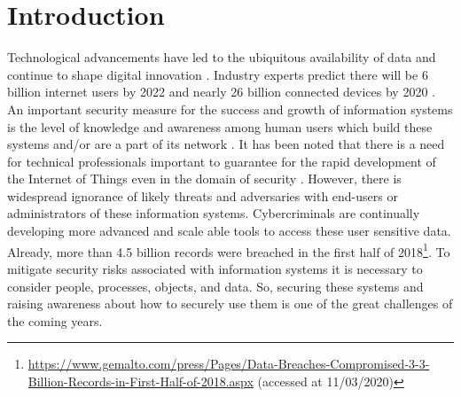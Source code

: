 \documentclass[runningheads]{llncs}
\begin{document}
\section{Introduction}
Technological advancements have led to the ubiquitous availability of data and continue to shape digital innovation \cite{davenport2013analytics}. Industry experts predict there will be 6 billion internet users by 2022 \cite{cybersecventures2019} and nearly 26 billion connected devices by 2020 \cite{hung2017gartner}. An important security measure for the success and growth of information systems is the level of knowledge and awareness among human users which build these systems and/or are a part of its network \cite{mahmoud2015internet}. It has been noted that there is a need for technical professionals important to guarantee for the rapid development of the Internet of Things even in the domain of security \cite{yu2010exploration}. 
However, there is widespread ignorance of likely threats and adversaries with end-users or administrators of these information systems. %
Cybercriminals are continually developing more advanced and scale able tools to access these user sensitive data. Already, more than 4.5 billion records were breached in the first half of 2018\footnote{\url{https://www.gemalto.com/press/Pages/Data-Breaches-Compromised-3-3-Billion-Records-in-First-Half-of-2018.aspx} (accessed at 11/03/2020)}. To mitigate security risks associated with information systems it is necessary to consider people, processes, objects, and data. So, securing these systems and raising awareness about how to securely use them is one of the great challenges of the coming years.  %
\end{document}
